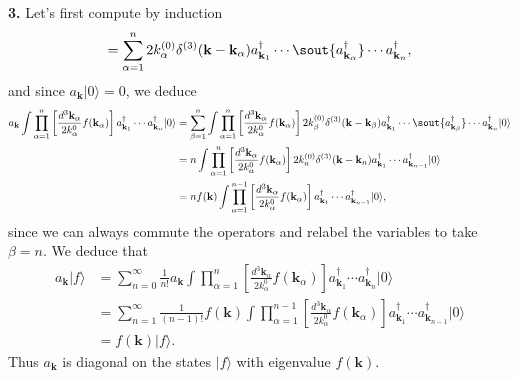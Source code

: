 \textbf{3.} Let's first compute by induction
\begin{equation}
    [a_{\mathbf{k}}, a^\dagger_{\mathbf{k}_1} \cdots a^\dagger_{\mathbf{k}_n}] = \sum_{\alpha=1}^n 2k^{(0)}_\alpha \delta^{(3)}(\mathbf{k} - \mathbf{k}_\alpha) a^\dagger_{\mathbf{k}_1} \cdots \sout{a^\dagger_{\mathbf{k}_\alpha}} \cdots a^\dagger_{\mathbf{k}_n},
\end{equation}
and since $a_{\mathbf{k}}|0\rangle = 0$, we deduce
\begin{equation}
\begin{aligned}
    a_{\mathbf{k}} \int \prod_{\alpha=1}^n \left[ \frac{d^3\mathbf{k}_\alpha}{2k^0_\alpha} f(\mathbf{k}_\alpha) \right] a^\dagger_{\mathbf{k}_1} \cdots a^\dagger_{\mathbf{k}_n} |0\rangle &= \sum_{\beta=1}^n \int \prod_{\alpha=1}^n \left[ \frac{d^3\mathbf{k}_\alpha}{2k^0_\alpha} f(\mathbf{k}_\alpha) \right] 2k^{(0)}_\beta \delta^{(3)}(\mathbf{k} - \mathbf{k}_\beta) a^\dagger_{\mathbf{k}_1} \cdots \sout{a^\dagger_{\mathbf{k}_\beta}} \cdots a^\dagger_{\mathbf{k}_n} |0\rangle \\
    &= n \int \prod_{\alpha=1}^n \left[ \frac{d^3\mathbf{k}_\alpha}{2k^0_\alpha} f(\mathbf{k}_\alpha) \right] 2k^{(0)}_n \delta^{(3)}(\mathbf{k} - \mathbf{k}_n) a^\dagger_{\mathbf{k}_1} \cdots a^\dagger_{\mathbf{k}_{n-1}} |0\rangle \\
    &= n f(\mathbf{k}) \int \prod_{\alpha=1}^{n-1} \left[ \frac{d^3\mathbf{k}_\alpha}{2k^0_\alpha} f(\mathbf{k}_\alpha) \right] a^\dagger_{\mathbf{k}_1} \cdots a^\dagger_{\mathbf{k}_{n-1}} |0\rangle,
\end{aligned}
\end{equation}
since we can always commute the operators and relabel the variables to take $\beta = n$. We deduce that
\begin{equation}
\begin{aligned}
    a_{\mathbf{k}} |f\rangle &= \sum_{n=0}^\infty \frac{1}{n!} a_{\mathbf{k}} \int \prod_{\alpha=1}^n \left[ \frac{d^3\mathbf{k}_\alpha}{2k^0_\alpha} f(\mathbf{k}_\alpha) \right] a^\dagger_{\mathbf{k}_1} \cdots a^\dagger_{\mathbf{k}_n} |0\rangle \\
    &= \sum_{n=1}^\infty \frac{1}{(n-1)!} f(\mathbf{k}) \int \prod_{\alpha=1}^{n-1} \left[ \frac{d^3\mathbf{k}_\alpha}{2k^0_\alpha} f(\mathbf{k}_\alpha) \right] a^\dagger_{\mathbf{k}_1} \cdots a^\dagger_{\mathbf{k}_{n-1}} |0\rangle \\
    &= f(\mathbf{k}) |f\rangle.
\end{aligned}
\end{equation}
Thus $a_{\mathbf{k}}$ is diagonal on the states $|f\rangle$ with eigenvalue $f(\mathbf{k})$.

